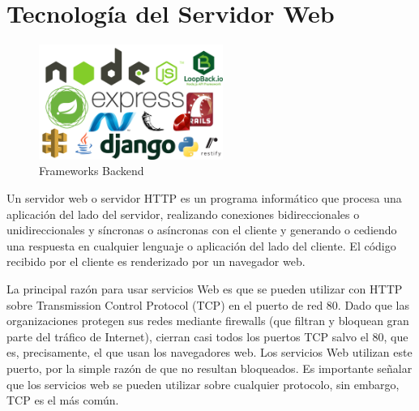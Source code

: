 \section{Tecnología del Servidor Web}
\begin{figure}[!h]
    \centering
    \includegraphics[width=60mm]{img/introduccion/frameworks-backend.png}
    \caption{Frameworks Backend}
\end{figure}
Un servidor web o servidor HTTP es un programa informático que procesa una aplicación del lado del servidor, realizando conexiones bidireccionales o unidireccionales y síncronas o asíncronas con el cliente y generando o cediendo una respuesta en cualquier lenguaje o aplicación del lado del cliente. El código recibido por el cliente es renderizado por un navegador web.

La principal razón para usar servicios Web es que se pueden utilizar con HTTP sobre Transmission Control Protocol (TCP) en el puerto de red 80. Dado que las organizaciones protegen sus redes mediante firewalls (que filtran y bloquean gran parte del tráfico de Internet), cierran casi todos los puertos TCP salvo el 80, que es, precisamente, el que usan los navegadores web. Los servicios Web utilizan este puerto, por la simple razón de que no resultan bloqueados. Es importante señalar que los servicios web se pueden utilizar sobre cualquier protocolo, sin embargo, TCP es el más común.

